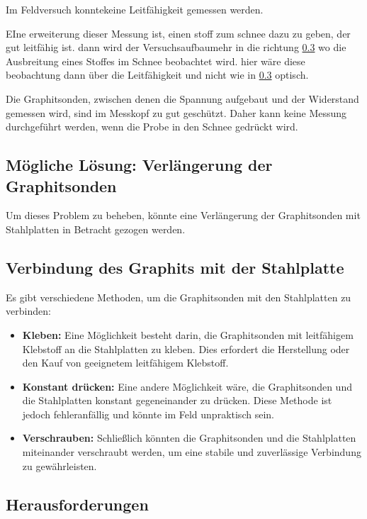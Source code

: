 Im Feldversuch konntekeine Leitfähigkeit gemessen werden.

EIne erweiterung dieser Messung ist, einen stoff zum schnee dazu zu geben, der gut leitfähig ist. dann wird der Versuchsaufbaumehr in die richtung \ref{} wo die Ausbreitung eines Stoffes im Schnee beobachtet wird. hier wäre diese beobachtung dann über die Leitfähigkeit und nicht wie in \ref{} optisch.

Die Graphitsonden, zwischen denen die Spannung aufgebaut und der Widerstand gemessen wird, sind im Messkopf zu gut geschützt. Daher kann keine Messung durchgeführt werden, wenn die Probe in den Schnee gedrückt wird.

\fi

\subsection{Mögliche Lösung: Verlängerung der Graphitsonden}

Um dieses Problem zu beheben, könnte eine Verlängerung der Graphitsonden mit Stahlplatten in Betracht gezogen werden.

\subsection{Verbindung des Graphits mit der Stahlplatte}

Es gibt verschiedene Methoden, um die Graphitsonden mit den Stahlplatten zu verbinden:

\begin{itemize}
    \item \textbf{Kleben:} Eine Möglichkeit besteht darin, die Graphitsonden mit leitfähigem Klebstoff an die Stahlplatten zu kleben. Dies erfordert die Herstellung oder den Kauf von geeignetem leitfähigem Klebstoff.
    \item \textbf{Konstant drücken:} Eine andere Möglichkeit wäre, die Graphitsonden und die Stahlplatten konstant gegeneinander zu drücken. Diese Methode ist jedoch fehleranfällig und könnte im Feld unpraktisch sein.
    \item \textbf{Verschrauben:} Schließlich könnten die Graphitsonden und die Stahlplatten miteinander verschraubt werden, um eine stabile und zuverlässige Verbindung zu gewährleisten.
\end{itemize}

\subsection{Herausforderungen}

